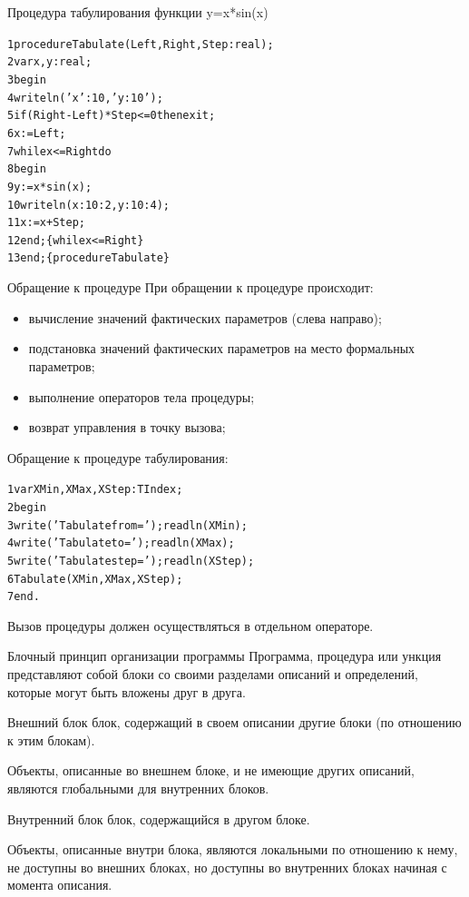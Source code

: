 \documentclass{beamer}
\begin{document}
\begin{frame}[fragile]{Процедура табулирования функции y=x*sin(x)}
\begin{alltt}
1 procedure Tabulate(Left, Right, Step: real);
2 var x, y: real;
3 begin
4   writeln('x':10,'y:10');
5   if (Right-Left) * Step <= 0 then exit;
6   x := Left;  
7   while x <= Right do 
8   begin
9     y := x * sin(x);
10    writeln(x:10:2,y:10:4);
11    x := x + Step;
12  end; \{while x <= Right\}
13 end; \{procedure Tabulate\}
\end{alltt}
\end{frame}

\begin{frame}[fragile]{Обращение к процедуре}
При обращении к процедуре происходит:
\begin{itemize}
\item вычисление значений фактических параметров (слева направо);
\item подстановка значений фактических параметров на место формальных параметров;
\item выполнение операторов тела процедуры;
\item возврат управления в точку вызова;
\end{itemize}
Обращение к процедуре табулирования:
\begin{alltt}
1 var XMin, XMax, XStep: TIndex; 
2 begin
3  write('Tabulate from = '); readln(XMin);
4  write('Tabulate to   = '); readln(XMax);
5  write('Tabulate step = '); readln(XStep);
6  Tabulate(XMin, XMax, XStep);
7 end.
\end{alltt}
Вызов процедуры должен осуществляться в отдельном операторе.
\end{frame}

\begin{frame}{Блочный принцип организации программы}
Программа, процедура или ункция представляют собой блоки со своими разделами описаний и определений, которые могут быть вложены друг в друга. 
\begin{block}{Внешний блок}
блок, содержащий в своем описании другие блоки (по отношению к этим блокам).
\end{block}
Объекты, описанные во внешнем блоке, и не имеющие других описаний, являются глобальными для внутренних блоков.
\begin{block}{Внутренний блок}
блок, содержащийся в другом блоке.
\end{block}
Объекты, описанные внутри блока, являются локальными по отношению к нему, не доступны во внешних блоках, но доступны во внутренних блоках начиная с момента описания. 
\end{frame}
\end{document}
